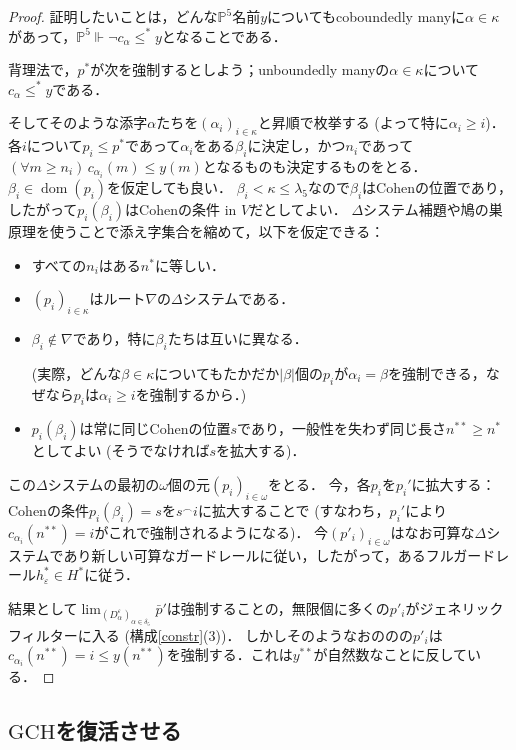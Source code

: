 \documentclass[uplatex,dvipdfmx]{jsarticle}
\newcommand{\dom}{\operatorname{dom}}
\newcommand\forces{\Vdash}
\newcommand{\GCH}{\mathrm{GCH}}
\newcommand{\ve}{\varepsilon}
\newcommand{\Pa}{\mathbb{P}^5}
\theoremstyle{definition}
\begin{document}
	\begin{proof}
		証明したいことは，どんな$\Pa$名前$y$についてもcoboundedly manyに$\alpha\in\kappa$があって，$\Pa\forces \lnot c_\alpha \le^* y$となることである．
		
		背理法で，$p^*$が次を強制するとしよう；unboundedly manyの$\alpha\in\kappa$について$c_\alpha\le^* y$である．
		
		そしてそのような添字$\alpha$たちを$(\alpha_i)_{i\in\kappa}$と昇順で枚挙する (よって特に$\alpha_i\ge i$)．
		各$i$について$p_i\le p^*$であって$\alpha_i$をある$\beta_i$に決定し，かつ$n_i$であって$(\forall m\ge n_i)\, c_{\alpha_i}(m)\le y(m)$となるものも決定するものをとる．
		$\beta_i\in\dom(p_i)$を仮定しても良い．
		$\beta_i<\kappa\le \lambda_5$なので$\beta_i$はCohenの位置であり，したがって$p_i(\beta_i)$はCohenの条件 in $V$だとしてよい．
		$\Delta$システム補題や鳩の巣原理を使うことで添え字集合を縮めて，以下を仮定できる：
		\begin{itemize}
			\item
			すべての$n_i$はある$n^*$に等しい．
			\item $(p_i)_{i\in\kappa}$はルート$\nabla$の$\Delta$システムである．
			\item $\beta_i \notin \nabla$であり，特に$\beta_i$たちは互いに異なる．
			
			(実際，どんな$\beta\in\kappa$についてもたかだか$|\beta|$個の$p_i$が$\alpha_i=\beta$を強制できる，なぜなら$p_i$は$\alpha_i\ge i$を強制するから．)
			\item $p_i(\beta_i)$は常に同じCohenの位置$s$であり，一般性を失わず同じ長さ$n^{**}\ge n^*$としてよい
			(そうでなければ$s$を拡大する)．
		\end{itemize}
		この$\Delta$システムの最初の$\omega$個の元$(p_i)_{i\in\omega}$をとる．
		今，各$p_i$を$p_i'$に拡大する：
		Cohenの条件$p_i(\beta_i)=s$を$s^\frown i$に拡大することで (すなわち，$p_i'$により$c_{\alpha_i}(n^{**})=i$がこれで強制されるようになる)．
		今$(p'_i)_{i\in\omega}$はなお可算な$\Delta$システムであり新しい可算なガードレールに従い，したがって，あるフルガードレール$h^*_\ve\in H^*$に従う．
		
		結果として$\lim_{(D^\ve_\alpha)_{\alpha\in \delta_5}}\bar p'$は強制することの，無限個に多くの$p'_i$がジェネリックフィルターに入る (構成\ref{constr}(3))．
		しかしそのようなおののの$p'_i$は$c_{\alpha_i}(n^{**})=i \le y(n^{**})$を強制する．これは$y^{**}$が自然数なことに反している．
	\end{proof}

	\subsection{$\GCH$を復活させる}
	
\end{document}

